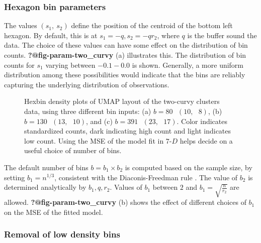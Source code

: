 \documentclass[
  12pt]{article}
\begin{document}
\subsubsection{Hexagon bin parameters}\label{hexagon-bin-parameters}

The values \((s_1, \ s_2)\) define the position of the centroid of the
bottom left hexagon. By default, this is at \(s_1 = -q, s_2 = -qr_2\),
where \(q\) is the buffer sound the data. The choice of these values can
have some effect on the distribution of bin counts.
\textbf{?@fig-param-two\_curvy} (a) illustrates this. The distribution
of bin counts for \(s_1\) varying between \(-0.1-0.0\) is shown.
Generally, a more uniform distribution among these possibilities would
indicate that the bins are reliably capturing the underlying
distribution of observations.

\begin{figure}[H]


\caption{\label{fig-bins-two-curvy}Hexbin density plots of UMAP layout
of the two-curvy clusters data, using three different bin inputs: (a)
\(b = 80 \text{ } (10, \text{ }8)\), (b)
\(b = 130 \text{ } (13, \text{ }10)\), and (c)
\(b = 391 \text{ } (23, \text{ }17)\). Color indicates standardized
counts, dark indicating high count and light indicates low count. Using
the MSE of the model fit in \(7\text{-}D\) helps decide on a useful
choice of number of bins.}

\end{figure}%

The default number of bins \(b=b_1\times b_2\) is computed based on the
sample size, by setting \(b_1=n^{1/3}\), consistent with the
Diaconis-Freedman rule \citep{freedman1981}. The value of \(b_2\) is
determined analytically by \(b_1, q, r_2\). Values of \(b_1\) between
\(2\) and \(b_1 = \sqrt{\frac{n}{r_2}}\) are allowed.
\textbf{?@fig-param-two\_curvy} (b) shows the effect of different
choices of \(b_1\) on the MSE of the fitted model.

\subsubsection{Removal of low density
bins}\label{removal-of-low-density-bins}
\end{document}
